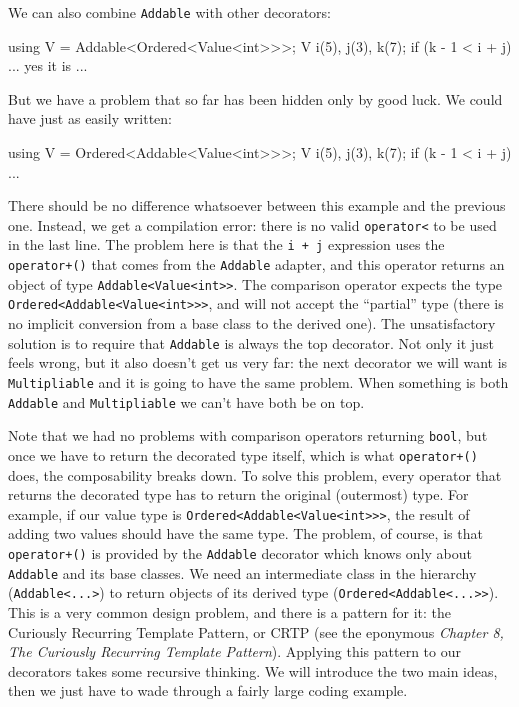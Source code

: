 We can also combine \texttt{Addable} with other decorators:

\begin{code}
using V = Addable<Ordered<Value<int>>>;
V i(5), j(3), k(7);
if (k - 1 < i + j) { ... yes it is ... }
\end{code}

But we have a problem that so far has been hidden only by good luck. We could have just as easily written:

\begin{code}
using V = Ordered<Addable<Value<int>>>;
V i(5), j(3), k(7);
if (k - 1 < i + j) { ... }
\end{code}

There should be no difference whatsoever between this example and the previous one. Instead, we get a compilation error: there is no valid \texttt{operator\textless{}} to be used in the last line. The problem here is that the \texttt{i\ +\ j} expression uses the \texttt{operator+()} that comes from the \texttt{Addable} adapter, and this operator returns an object of type \texttt{Addable\textless{}Value\textless{}int\textgreater{}\textgreater{}}. The comparison operator expects the type \texttt{Ordered\textless{}Addable\textless{}Value\textless{}int\textgreater{}\textgreater{}\textgreater{}}, and will not accept the ``partial'' type (there is no implicit conversion from a base class to the derived one). The unsatisfactory solution is to require that \texttt{Addable} is always the top decorator. Not only it just feels wrong, but it also doesn't get us very far: the next decorator we will want is \texttt{Multipliable} and it is going to have the same problem. When something is both \texttt{Addable} and \texttt{Multipliable} we can't have both be on top.

Note that we had no problems with comparison operators returning \texttt{bool}, but once we have to return the decorated type itself, which is what \texttt{operator+()} does, the composability breaks down. To solve this problem, every operator that returns the decorated type has to return the original (outermost) type. For example, if our value type is \texttt{Ordered\textless{}Addable\textless{}Value\textless{}int\textgreater{}\textgreater{}\textgreater{}}, the result of adding two values should have the same type. The problem, of course, is that \texttt{operator+()} is provided by the \texttt{Addable} decorator which knows only about \texttt{Addable} and its base classes. We need an intermediate class in the hierarchy (\texttt{Addable\textless{}...\textgreater{}}) to return objects of its derived type (\texttt{Ordered\textless{}Addable\textless{}...\textgreater{}\textgreater{}}). This is a very common design problem, and there is a pattern for it: the Curiously Recurring Template Pattern, or CRTP (see the eponymous \emph{Chapter 8, The Curiously Recurring Template Pattern}). Applying this pattern to our decorators takes some recursive thinking. We will introduce the two main ideas, then we just have to wade through a fairly large coding example.

